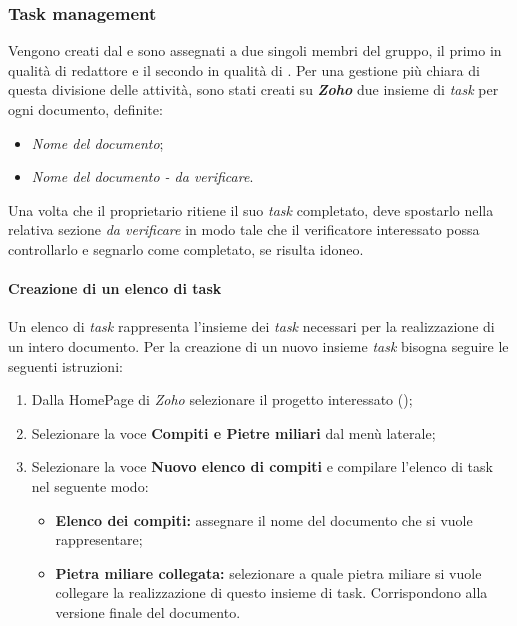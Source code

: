 \subsubsection{Task management}
Vengono creati dal \textit{\RdP} e sono assegnati a due singoli membri del gruppo, 
il primo in qualità di redattore e il secondo in qualità di \textit{\Ver}.
Per una gestione più chiara di questa divisione delle attività, sono stati creati su \textit{\textbf{Zoho}} 
due insieme di \textit{task} per ogni documento, definite:
\begin{itemize}
  \item \textit{Nome del documento};
  \item \textit{Nome del documento - da verificare}.
\end{itemize}
Una volta che il proprietario ritiene il suo \textit{task} completato, deve spostarlo 
nella relativa sezione \textit{da verificare} in modo tale che il verificatore 
interessato possa controllarlo e segnarlo come completato, se risulta idoneo. 

\paragraph{Creazione di un elenco di task}
Un elenco di \textit{task} rappresenta l'insieme dei \textit{task} necessari per la realizzazione di un intero documento.
Per la creazione di un nuovo insieme \textit{task} bisogna seguire le seguenti istruzioni:
\begin{enumerate}
   \item Dalla HomePage di \textit{Zoho} selezionare il progetto interessato (\progetto);
  \item Selezionare la voce \textbf{Compiti e Pietre miliari} dal menù laterale;
   \item Selezionare la voce \textbf{Nuovo elenco di compiti} e compilare l'elenco di task nel 
  seguente modo:
  \begin{itemize}
    \item \textbf{Elenco dei compiti:} assegnare il nome del documento che si 
    vuole rappresentare;
    \item \textbf{Pietra miliare collegata:} selezionare a quale pietra miliare si 
    vuole collegare la realizzazione di questo insieme di task. Corrispondono alla 
    versione finale del documento.
  \end{itemize}
\end{enumerate}
